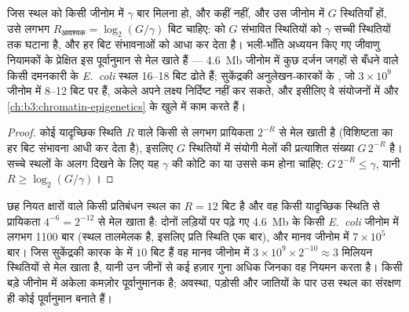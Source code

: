 \begin{proposition}[किसी स्थल को कितनी सूचना चाहिए]\label{prop:b3:bioinformatics:bits}
जिस स्थल को किसी जीनोम में $\gamma$ बार मिलना हो, और कहीं नहीं, और उस
जीनोम में $G$ स्थितियाँ हों, उसे लगभग $R_{\text{आवश्यक}} = \log_{2}(G/\gamma)$
बिट  चाहिए:  को $G$ संभावित स्थितियों को $\gamma$
सच्ची स्थितियों तक घटाना है, और हर बिट संभावनाओं को आधा कर देता है।
भली-भाँति अध्ययन किए गए जीवाणु नियामकों के प्रेक्षित  इस
पूर्वानुमान से मेल खाते हैं --- \qty{4.6}{Mb} जीनोम में कुछ दर्जन जगहों
से बँधने वाले किसी दमनकारी के \emph{E.~coli} स्थल \numrange{16}{18} बिट
ढोते हैं; सुकेंद्रकी अनुलेखन-कारकों के , जो $3\times 10^{9}$
जीनोम में \numrange{8}{12} बिट पर हैं, अकेले अपने लक्ष्य निर्दिष्ट नहीं
कर सकते, और इसीलिए वे संयोजनों में और
\cref{ch:b3:chromatin-epigenetics} के खुले  में काम करते हैं।
\end{proposition}
\begin{proof}
कोई यादृच्छिक स्थिति  $R$ वाले किसी  से लगभग
प्रायिकता $2^{-R}$ से मेल खाती है (विशिष्टता का हर बिट संभावना आधी कर
देता है), इसलिए $G$ स्थितियों में संयोगी मेलों की प्रत्याशित संख्या $G\,2^{-R}$ है।
सच्चे स्थलों के अलग दिखने के लिए यह $\gamma$ की कोटि का या उससे कम होना
चाहिए: $G\,2^{-R} \le \gamma$, यानी $R \ge \log_{2}(G/\gamma)$।
\end{proof}

\begin{example}[प्रत्याशित संयोगी मेल]\label{ex:b3:bioinformatics:motif-numbers}
छह नियत क्षारों वाले किसी प्रतिबंधन स्थल का $R = 12$ बिट है और वह किसी
यादृच्छिक स्थिति से प्रायिकता $4^{-6} = 2^{-12}$ से मेल खाता है: दोनों
लड़ियों पर पढ़े गए \qty{4.6}{Mb} के किसी \emph{E.~coli} जीनोम में लगभग \num{1100}
बार (स्थल तालमेलक है, इसलिए प्रति स्थिति एक बार), और मानव जीनोम में $7\times 10^{5}$
बार। जिस सुकेंद्रकी कारक के  में $10$ बिट हैं वह मानव जीनोम
में $3\times 10^{9}\times 2^{-10} \approx 3$ मिलियन स्थितियों से मेल
खाता है, यानी उन जीनों से कई हज़ार गुना अधिक जिनका वह नियमन करता है।
किसी बड़े जीनोम में अकेला  कमज़ोर पूर्वानुमानक है;
 अवस्था, पड़ोसी  और जातियों के पार उस स्थल का संरक्षण
ही कोई पूर्वानुमान बनाते हैं।
\end{example}


